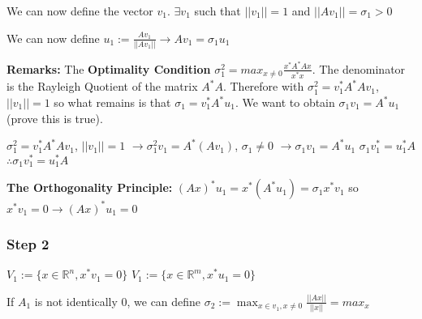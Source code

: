 \documentclass{article}
\newcommand{\n}{\newline}
\begin{document}
	We can now define the vector $v_{1}$.  $\exists v_{1}$ such that $||v_{1}||=1$ and $||Av_{1}||=\sigma_{1}>0$\n
	
	We can now define $u_{1}:=\frac{Av_{1}}{||Av_{1}||}\rightarrow Av_{1}=\sigma_{1}u_{1}$\n
	
	\textbf{Remarks: }The \textbf{Optimality Condition} $\sigma_{1}^{2}=max_{x\neq0}\frac{x^{*}A^{*}Ax}{x^{*}x}$.  The denominator is the Rayleigh Quotient of the matrix $A^{*}A$.  Therefore with $\sigma_{1}^{2}=v_{1}^{*}A^{*}Av_{1}$, $||v_{1}||=1$ so what remains is that $\sigma_{1}=v_{1}^{*}A^{*}u_{1}$.  We want to obtain $\sigma_{1}v_{1}=A^{*}u_{1}$ (prove this is true).\n
	
	$\sigma_{1}^{2}=v_{1}^{*}A^{*}Av_{1}$, $||v_{1}||=1$\n
	$\rightarrow \sigma_{1}^{2}v_{1}=A^{*}(Av_{1})$, $\sigma_{1}\neq0$\n
	$\rightarrow \sigma_{1}v_{1}=A^{*}u_{1}$\n
	$\sigma_{1}v_{1}^{*}=u_{1}^{*}A$\n
	$\therefore \sigma_{1}v_{1}^{*}=u_{1}^{*}A$
	
	\textbf{The Orthogonality Principle:} $(Ax)^{*}u_{1}=x^{*}(A^{*}u_{1})=\sigma_{1}x^{*}v_{1}$ so $x^{*}v_{1}=0\rightarrow(Ax)^{*}u_{1}=0$
	
	\subsubsection{Step 2}
	
	$V_{1}:=\{x\in\mathbb{R}^{n},x^{*}v_{1}=0\}$\n
	$V_{1}:=\{x\in\mathbb{R}^{m},x^{*}u_{1}=0\}$\n
	
	If $A_{1}$ is not identically 0, we can define $\sigma_{2}:=\max_{x\in v_{1}, x\neq0} \frac{||Ax||}{||x||}=max_{x}$
	
 
\end{document}
